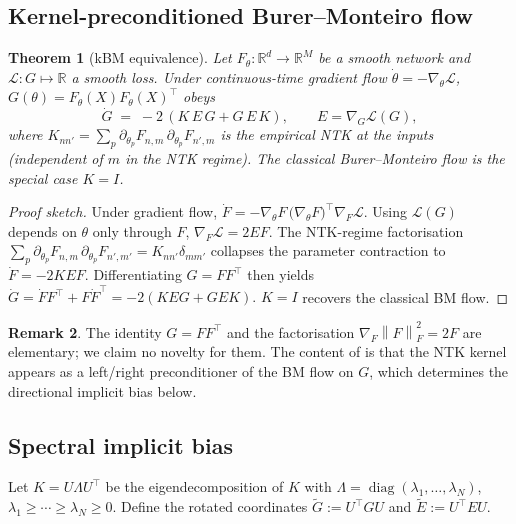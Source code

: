 \documentclass[11pt]{article}
\newtheorem{theorem}{Theorem}
\theoremstyle{definition}
\newtheorem{remark}[theorem]{Remark}
\theoremstyle{plain}
\DeclareMathOperator{\diag}{diag}
\newcommand{\R}{\mathbb{R}}
\newcommand{\norm}[1]{\left\lVert#1\right\rVert}
\begin{document}
\subsection{Kernel-preconditioned Burer--Monteiro flow}

\begin{theorem}[kBM equivalence]
\label{thm:kbm}
Let $F_\theta:\R^d\to\R^M$ be a smooth network and $\mathcal{L}:G\mapsto\R$ a
smooth loss. Under continuous-time gradient flow $\dot\theta=-\nabla_\theta\mathcal{L}$,
$G(\theta)=F_\theta(X)F_\theta(X)^\top$ obeys
\begin{equation}
\label{eq:kbm-derived}
   \dot G \;=\; -2\,(K\,E\,G + G\,E\,K),\qquad E=\nabla_G\mathcal{L}(G),
\end{equation}
where $K_{nn'} = \sum_p \partial_{\theta_p} F_{n,m}\,\partial_{\theta_p}F_{n',m}$ is
the empirical NTK at the inputs (independent of $m$ in the NTK regime).
The classical Burer--Monteiro flow is the special case $K=I$.
\end{theorem}

\begin{proof}[Proof sketch]
Under gradient flow,
\(
   \dot F = -\nabla_\theta F\,\bigl(\nabla_\theta F\bigr)^{\!\top}\nabla_F\mathcal{L}.
\)
Using $\mathcal{L}(G)$ depends on $\theta$ only through $F$, $\nabla_F\mathcal{L} = 2 E F$. The NTK-regime
factorisation $\sum_p\partial_{\theta_p}F_{n,m}\,\partial_{\theta_p}F_{n',m'}=K_{nn'}\delta_{mm'}$
collapses the parameter contraction to $\dot F = -2KEF$. Differentiating
$G=FF^\top$ then yields
\(
   \dot G = \dot F F^\top + F \dot F^\top = -2(KEG+GEK).
\)
$K=I$ recovers the classical BM flow.
\end{proof}

\begin{remark}
The identity $G=FF^\top$ and the factorisation $\nabla_F\norm{F}_F^2=2F$ are
elementary; we claim no novelty for them. The content of  is
that the NTK kernel appears as a left/right preconditioner of the BM flow on
$G$, which determines the directional implicit bias below.
\end{remark}

\subsection{Spectral implicit bias}

Let $K=U\Lambda U^\top$ be the eigendecomposition of $K$ with
$\Lambda=\diag(\lambda_1,\ldots,\lambda_N)$, $\lambda_1\ge\cdots\ge\lambda_N\ge0$.
Define the rotated coordinates $\widetilde G:=U^\top G U$ and
$\widetilde E:=U^\top E U$.
\end{document}
